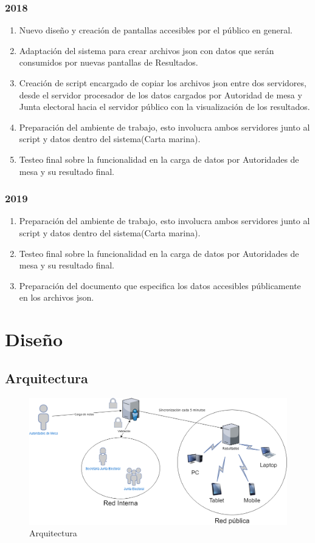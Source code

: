\subsubsection{2018}
\begin{enumerate}
    \item Nuevo diseño y creación de pantallas accesibles por el público en general.
    \item Adaptación del sistema para crear archivos json con datos que serán consumidos por nuevas pantallas de Resultados.
    \item Creación de script encargado de copiar los archivos json entre dos servidores, desde el servidor procesador de los datos cargados por Autoridad de mesa y Junta electoral hacia el servidor público con la visualización de los resultados.
    \item Preparación del ambiente de trabajo, esto involucra ambos servidores junto al script y datos dentro del sistema(Carta marina).
    \item Testeo final sobre la funcionalidad en la carga de datos por Autoridades de mesa y su resultado final.
\end{enumerate}
\subsubsection{2019}
\begin{enumerate}
    \item Preparación del ambiente de trabajo, esto involucra ambos servidores junto al script y datos dentro del sistema(Carta marina).
    \item Testeo final sobre la funcionalidad en la carga de datos por Autoridades de mesa y su resultado final.
    \item Preparación del documento que especifica los datos accesibles públicamente en los archivos json.
\end{enumerate}

\section{Diseño}
\subsection{Arquitectura}
\begin{figure}[h!]
  \includegraphics[width=\textwidth]{img/arquitectura.png}
  \caption{Arquitectura}
  \label{graf:arquitectura}
\end{figure}

